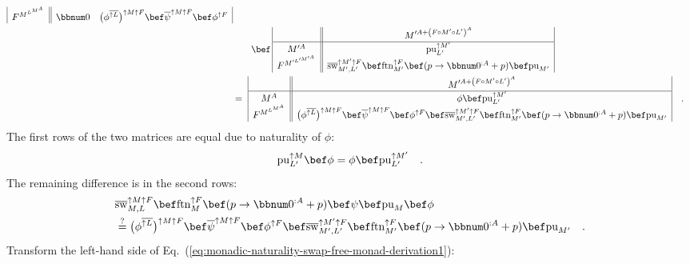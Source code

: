 \begin{align*}
\begin{array}{|c||cc|}
F^{M^{L^{M^{A}}}} & \bbnum 0 & \big(\phi^{\overline{\uparrow L}}\big)^{\uparrow M\uparrow F}\bef\overline{\psi}^{\uparrow M\uparrow F}\bef\phi^{\uparrow F}
\end{array}\\
 & \quad\quad\bef\,\begin{array}{|c||c|}
 & M^{\prime A+\left(F\circ M^{\prime}\circ L^{\prime}\right)^{A}}\\
\hline M^{\prime A} & \text{pu}_{L^{\prime}}^{\uparrow M^{\prime}}\\
F^{M^{\prime L^{\prime M^{\prime A}}}} & \overline{\text{sw}}_{M^{\prime},L^{\prime}}^{\uparrow M^{\prime}\uparrow F}\bef\text{ftn}_{M^{\prime}}^{\uparrow F}\bef(p\rightarrow\bbnum 0^{:A}+p)\bef\text{pu}_{M^{\prime}}
\end{array}\\
 & =\,\,\begin{array}{|c||c|}
 & M^{\prime A+\left(F\circ M^{\prime}\circ L^{\prime}\right)^{A}}\\
\hline M^{A} & \phi\bef\text{pu}_{L^{\prime}}^{\uparrow M^{\prime}}\\
F^{M^{L^{M^{A}}}} & \big(\phi^{\overline{\uparrow L}}\big)^{\uparrow M\uparrow F}\bef\overline{\psi}^{\uparrow M\uparrow F}\bef\phi^{\uparrow F}\bef\overline{\text{sw}}_{M^{\prime},L^{\prime}}^{\uparrow M^{\prime}\uparrow F}\bef\text{ftn}_{M^{\prime}}^{\uparrow F}\bef(p\rightarrow\bbnum 0^{:A}+p)\bef\text{pu}_{M^{\prime}}
\end{array}\quad.
\end{align*}
The first rows of the two matrices are equal due to naturality of
$\phi$:
\[
\text{pu}_{L^{\prime}}^{\uparrow M}\bef\phi=\phi\bef\text{pu}_{L^{\prime}}^{\uparrow M^{\prime}}\quad.
\]
The remaining difference is in the second rows:
\begin{align}
 & \overline{\text{sw}}_{M,L}^{\uparrow M\uparrow F}\bef\text{ftn}_{M}^{\uparrow F}\bef(p\rightarrow\bbnum 0^{:A}+p)\bef\psi\bef\text{pu}_{M}\bef\phi\nonumber \\
 & \overset{?}{=}\big(\phi^{\overline{\uparrow L}}\big)^{\uparrow M\uparrow F}\bef\overline{\psi}^{\uparrow M\uparrow F}\bef\phi^{\uparrow F}\bef\overline{\text{sw}}_{M^{\prime},L^{\prime}}^{\uparrow M^{\prime}\uparrow F}\bef\text{ftn}_{M^{\prime}}^{\uparrow F}\bef(p\rightarrow\bbnum 0^{:A}+p)\bef\text{pu}_{M^{\prime}}\quad.\label{eq:monadic-naturality-swap-free-monad-derivation1}
\end{align}
Transform the left-hand side of Eq.~(\ref{eq:monadic-naturality-swap-free-monad-derivation1}):

